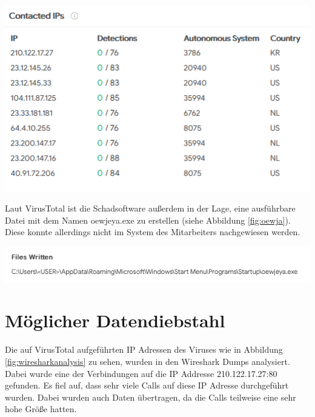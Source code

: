 \begin{center}
	\includegraphics[width=15.8cm]{figures/virustotal-fklm03.PNG}
	\label{fig:virustotal-fklm03}
\end{center}

Laut VirusTotal ist die Schadsoftware außerdem in der Lage, eine ausführbare Datei mit dem Namen oewjeya.exe zu erstellen (siehe Abbildung \ref{fig:oewja}).
Diese konnte allerdings nicht im System des Mitarbeiters nachgewiesen werden.

\begin{center}
	\includegraphics[width=15.8cm]{figures/oewja.png}
	\label{fig:oewja}
\end{center}

\chapter{Möglicher Datendiebstahl}
\label{ch:Datendiebstahl}
Die auf VirusTotal aufgeführten IP Adressen des Viruses wie in Abbildung \ref{fig:wiresharkanalysis} zu sehen, wurden in den Wireshark Dumps analysiert. Dabei wurde eine der Verbindungen auf die IP Addresse 210.122.17.27:80 gefunden. Es fiel auf, dass sehr viele Calls auf diese IP Adresse durchgeführt wurden. Dabei wurden auch Daten übertragen, da die Calls teilweise eine sehr hohe Größe hatten.


